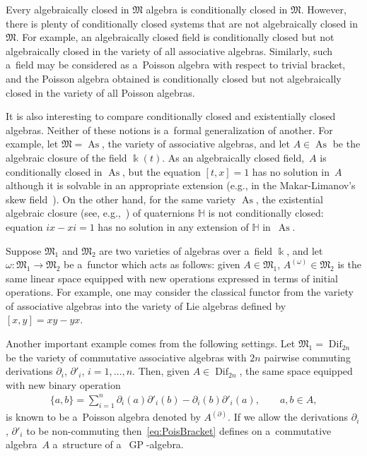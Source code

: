 \documentclass[11pt]{article}
\begin{document}
Every algebraically closed in $\mathfrak M$ algebra is conditionally closed in $\mathfrak M$.
However, there is plenty of conditionally closed systems that are not algebraically closed in $\mathfrak M$.
For example, an algebraically closed f\/ield is conditionally closed but not algebraically closed in the variety of all
associative algebras.
Similarly, such a~f\/ield may be considered as a~Poisson algebra with respect to trivial bracket, and the Poisson algebra
obtained is conditionally closed but not algebraically closed in the variety of all Poisson algebras.

It is also interesting to compare conditionally closed and existentially closed algebras.
Neither of these notions is a~formal generalization of another.
For example, let $\mathfrak M=\operatorname{As}$, the variety of associative algebras, and let $A\in \operatorname{As}$ be the algebraic closure of
the f\/ield $\Bbbk(t)$.
As an algebraically closed f\/ield,~$A$ is conditionally closed in $\operatorname{As}$, but the equation $[t,x]=1$ has no solution in~$A$
although it is solvable in an appropriate extension (e.g., in the Makar-Limanov's skew f\/ield~\cite{LML85}).
On the other hand, for the same variety $\operatorname{As}$, the existential algebraic closure (see, e.g.,~\cite[Chapter~III]{Cherlin})
of quaternions $\mathbb H$ is not conditionally closed: equation $ix-xi=1$ has no solution in any extension of $\mathbb
H$ in~$\operatorname{As}$.

Suppose $\mathfrak M_1$ and $\mathfrak M_2$ are two varieties of algebras over a~f\/ield $\Bbbk $, and let $\omega:
\mathfrak M_1 \to \mathfrak M_2$ be a~functor which acts as follows: given $A\in \mathfrak M_1$, $A^{(\omega)}\in
\mathfrak M_2$ is the same linear space equipped with new operations expressed in terms of initial operations.
For example, one may consider the classical functor from the variety of associative algebras into the variety of Lie
algebras def\/ined by $[x,y] = xy-yx$.

Another important example comes from the following settings.
Let $\mathfrak M_1 = \operatorname{Dif}_{2n}$ be the variety of commutative associative algebras with $2n$ pairwise commuting
derivations $\partial_i$, $\partial'_i$, $i=1,\dots, n$.
Then, given $A\in \operatorname{Dif}_{2n}$, the same space equipped with new binary operation
\begin{gather}
\label{eq:PoisBracket}
\{a,b\} = \sum\limits_{i=1}^n \partial_i(a)\partial'_i(b) - \partial_i(b)\partial'_i(a),
\qquad
a,b\in A,
\end{gather}
is known to be a~Poisson algebra denoted by $A^{(\partial)}$.
If we allow the derivations $\partial_i$, $\partial'_i$ to be non-commuting then~\eqref{eq:PoisBracket} def\/ines on
a~commutative algebra~$A$ a~structure of a~$\operatorname{GP}$-algebra.
\end{document}
